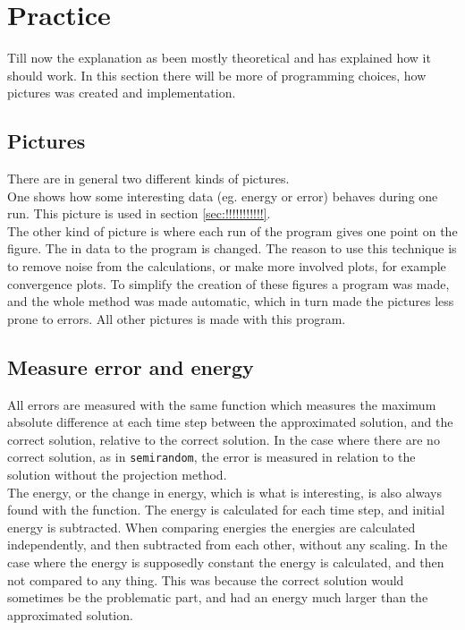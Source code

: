 \chapter{Practice}%
Till now the explanation as been mostly theoretical and has explained how it should work. In this section there will be more of programming choices, how pictures was created and implementation.

\section{Pictures}%

There are in general two different kinds of pictures.\\ One shows how some interesting data (eg. energy or error) behaves during one run. This picture is used in section \ref{sec:!!!!!!!!!!!}. \\
The other kind of picture is where each run of the program gives one point on the figure. The in data to the program is changed. The reason to use this technique is to remove noise from the calculations, or make more involved plots, for example convergence plots. To simplify the creation of these figures a program was made, and the whole method was made automatic, which in turn made the pictures less prone to errors. All other pictures is made with this program.

\section{Measure error and energy} %
All errors are measured with the same function which measures the maximum absolute difference at each time step between the approximated solution, and the correct solution, relative to the correct solution. In the case where there are no correct solution, as in \texttt{semirandom}, the error is measured in relation to the solution without the projection method. \\

The energy, or the change in energy, which is what is interesting, is also always found with the function. The energy is calculated for each time step, and initial energy is subtracted. When comparing energies the energies are calculated independently, and then subtracted from each other, without any scaling. In the case where the energy is supposedly constant the energy is calculated, and then not compared to any thing. This was because the correct solution would sometimes be the problematic part, and had an energy much larger than the approximated solution.\\

